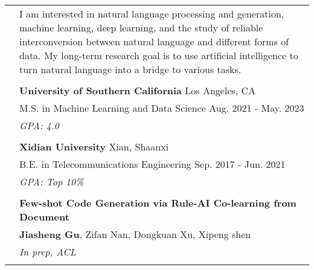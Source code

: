 \documentclass[letterpaper, 10pt]{article}
\begin{document}
\begin{longtable}{p{1.3in}p{4.8in}}



\nohyphens{\color{black}{Research Interests}}
& I am interested in natural language processing and generation, machine learning, deep learning, and the study of reliable interconversion between natural language and different forms of data. My long-term research goal is to use artificial intelligence to turn natural language into a bridge to various tasks. \\

\\




\color{black}{Education} & \textbf{University of Southern California} \hfill Los Angeles, CA \\
& M.S. in Machine Learning and Data Science \hfill Aug. 2021 - May. 2023\\
& {\it GPA: 4.0}\\
& \\

& \textbf{Xidian University} \hfill Xian, Shaanxi\\
& B.E. in Telecommunications Engineering \hfill Sep. 2017 - Jun. 2021 \\
& {\it GPA: Top 10\%}\\
& \\



\nohyphens{\color{black}{Publications}}
& \textbf{Few-shot Code Generation via Rule-AI Co-learning from Document\label{few-shot_code}}  \\
& \textbf{Jiasheng Gu}, Zifan Nan, Dongkuan Xu, Xipeng shen \\
& \textit{In prep, ACL}\\
& \\



\end{longtable}
\end{document}
